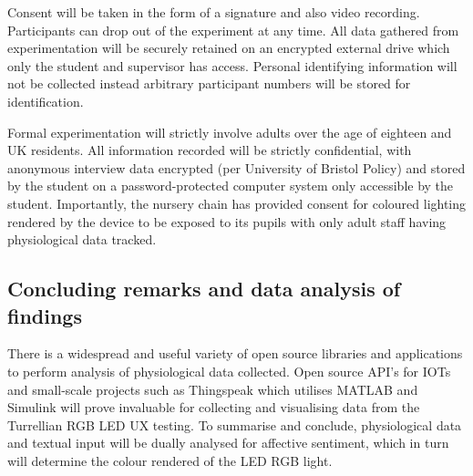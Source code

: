 \documentclass{sigchi}
\begin{document}
Consent will be taken in the form of a signature and also video recording. Participants can drop out of the experiment at any time. All data gathered from experimentation will be securely retained on an encrypted external drive which only the student and supervisor has access. Personal identifying information will not be collected instead arbitrary participant numbers will be stored for identification. 

Formal experimentation will strictly involve adults over the age of eighteen and UK residents. All information recorded will be strictly confidential, with anonymous interview data encrypted (per University of Bristol Policy) and stored by the student on a password-protected computer system only accessible by the student. Importantly, the nursery chain has provided consent for coloured lighting rendered by the device to be exposed to its pupils with only adult staff having physiological data tracked. 

\subsection{Concluding remarks and data analysis of findings}

There is a widespread and useful variety of open source libraries and applications to perform analysis of physiological data collected. Open source API’s for IOTs and small-scale projects such as Thingspeak which utilises MATLAB and Simulink will prove invaluable for collecting and visualising data from the Turrellian RGB LED UX testing. To summarise and conclude, physiological data and textual input will be dually analysed for affective sentiment, which in turn will determine the colour rendered of the LED RGB light.
\end{document}
